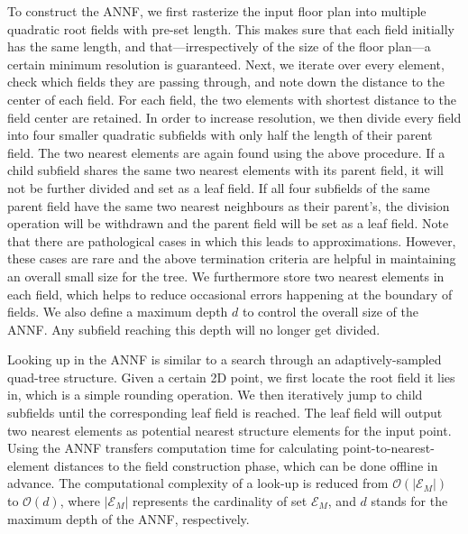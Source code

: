 \documentclass[letterpaper, 10 pt, conference]{ieeeconf}  %
\begin{document}
To construct the ANNF, we first rasterize the input floor plan into multiple quadratic root fields with pre-set length. This makes sure that each field initially has the same length, and that---irrespectively of the size of the floor plan---a certain minimum resolution is guaranteed. Next, we iterate over every element, check which fields they are passing through, and note down the distance to the center of each field. For each field, the two elements with shortest distance to the field center are retained. In order to increase resolution, we then divide every field into four smaller quadratic subfields with only half the length of their parent field. The two nearest elements are again found using the above procedure. If a child subfield shares the same two nearest elements with its parent field, it will not be further divided and set as a leaf field. If all four subfields of the same parent field have the same two nearest neighbours as their parent's, the division operation will be withdrawn and the parent field will be set as a leaf field. Note that there are pathological cases in which this leads to approximations. However, these cases are rare and the above termination criteria are helpful in maintaining an overall small size for the tree. We furthermore store two nearest elements in each field, which helps to reduce occasional errors happening at the boundary of fields. We also define a maximum depth $d$ to control the overall size of the ANNF. Any subfield reaching this depth will no longer get divided.

Looking up in the ANNF is similar to a search through an adaptively-sampled quad-tree structure. Given a certain 2D point, we first locate the root field it lies in, which is a simple rounding operation. We then iteratively jump to child subfields until the corresponding leaf field is reached. The leaf field will output two nearest elements as potential nearest structure elements for the input point. Using the ANNF transfers computation time for calculating point-to-nearest-element distances to the field construction phase, which can be done offline in advance. The computational complexity of a look-up is reduced from $\mathcal{O}(|\mathcal{E}_M|)$ to $\mathcal{O}(d)$, where $|\mathcal{E}_M|$ represents the cardinality of set $\mathcal{E}_M$, and $d$ stands for the maximum depth of the ANNF, respectively.
\end{document}
